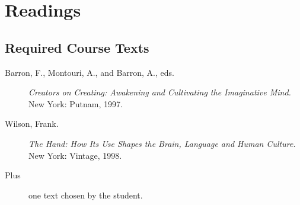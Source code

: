 \documentclass[letterpaper,10pt,headsepline]{scrreprt}
\begin{document}
\section{Readings}
\subsection{Required Course Texts}

\begin{description}
\item [Barron, F., Montouri, A., and Barron, A., eds.] \textit{Creators on Creating: Awakening and Cultivating the Imaginative Mind.}
\\New York: Putnam, 1997.
\item[Wilson, Frank.] \textit{The Hand: How Its Use Shapes the Brain, Language and Human Culture.}
\\New York: Vintage, 1998.
\item[Plus] {one text chosen by the student.}
\end{description}
\end{document}
